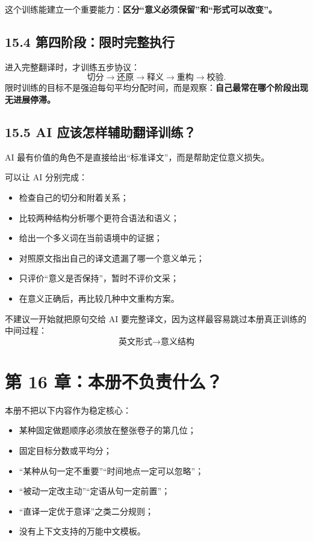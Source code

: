 \documentclass[11pt,a4paper]{ctexart}
\newcommand{\kw}[1]{\textbf{#1}}
\begin{document}
这个训练能建立一个重要能力：\kw{区分“意义必须保留”和“形式可以改变”。}

\subsection{15.4 第四阶段：限时完整执行}
进入完整翻译时，才训练五步协议：
\[
\text{切分} \rightarrow \text{还原} \rightarrow \text{释义} \rightarrow \text{重构} \rightarrow \text{校验}.
\]
限时训练的目标不是强迫每句平均分配时间，而是观察：\kw{自己最常在哪个阶段出现无进展停滞。}

\subsection{15.5 AI 应该怎样辅助翻译训练？}
AI 最有价值的角色不是直接给出“标准译文”，而是帮助定位意义损失。

可以让 AI 分别完成：
\begin{itemize}
  \item 检查自己的切分和附着关系；
  \item 比较两种结构分析哪个更符合语法和语义；
  \item 给出一个多义词在当前语境中的证据；
  \item 对照原文指出自己的译文遗漏了哪一个意义单元；
  \item 只评价“意义是否保持”，暂时不评价文采；
  \item 在意义正确后，再比较几种中文重构方案。
\end{itemize}

不建议一开始就把原句交给 AI 要完整译文，因为这样最容易跳过本册真正训练的中间过程：
\[
\boxed{\text{英文形式} \rightarrow \text{意义结构}}
\]

\section{第 16 章：本册不负责什么？}

本册不把以下内容作为稳定核心：
\begin{itemize}
  \item 某种固定做题顺序必须放在整张卷子的第几位；
  \item 固定目标分数或平均分；
  \item “某种从句一定不重要”“时间地点一定可以忽略”；
  \item “被动一定改主动”“定语从句一定前置”；
  \item “直译一定优于意译”之类二分规则；
  \item 没有上下文支持的万能中文模板。
\end{itemize}
\end{document}
